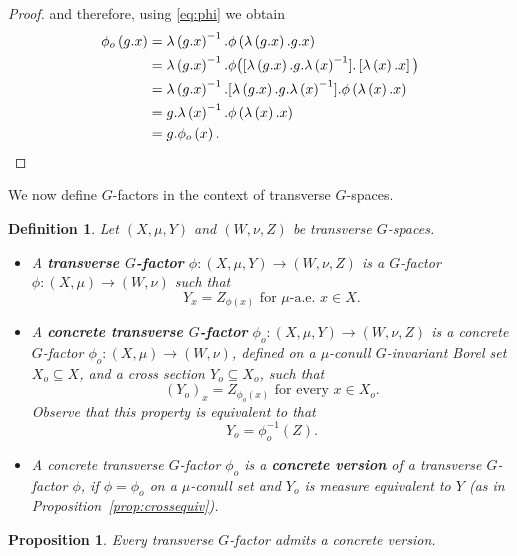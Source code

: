 \documentclass{amsart}
\numberwithin{equation}{subsection}
\newtheorem{prop}[thm]{Proposition}
\newtheorem{defn}[thm]{Definition}
\theoremstyle{remark}
\begin{document}
\begin{proof}
and therefore, using \eqref{eq:phi} we obtain
\begin{align*}
\phi_{o}\left(g.x\right)	
&=\lambda\left(g.x\right)^{-1}.\phi\left(\lambda\left(g.x\right).g.x\right)\\
&=\lambda\left(g.x\right)^{-1}.\phi\big(\small[\lambda\left(g.x\right).g.\lambda\left(x\right)^{-1}\small].\left[\lambda\left(x\right).x\right]\big)\\
&=\lambda\left(g.x\right)^{-1}.\small[\lambda\left(g.x\right).g.\lambda\left(x\right)^{-1}\small].\phi\left(\lambda\left(x\right).x\right)\\
&=g.\lambda\left(x\right)^{-1}.\phi\left(\lambda\left(x\right).x\right)\\
&=g.\phi_{o}\left(x\right).\qedhere
\end{align*}
\end{proof}

We now define \(G\)-factors in the context of transverse \(G\)-spaces.

\begin{defn}
Let \(\left(X,\mu,Y\right)\) and \(\left(W,\nu,Z\right)\) be transverse \(G\)-spaces.
\begin{itemize}
    \item A {\bf transverse \(G\)-factor} \(\phi:\left(X,\mu,Y\right)\to\left(W,\nu,Z\right)\) is a \(G\)-factor \(\phi:\left(X,\mu\right)\to\left(W,\nu\right)\) such that
    \[Y_{x}=Z_{\phi\left(x\right)}\text{ for }\mu\text{-a.e. }x\in X.\]
    \item A {\bf concrete transverse \(G\)-factor} \(\phi_{o}:\left(X,\mu,Y\right)\to\left(W,\nu,Z\right)\) is a concrete \(G\)-factor \(\phi_{o}:\left(X,\mu\right)\to\left(W,\nu\right)\), defined on a \(\mu\)-conull \(G\)-invariant Borel set \(X_{o}\subseteq X\), and a cross section \(Y_{o}\subseteq X_{o}\), such that
    \[\left(Y_{o}\right)_{x}=Z_{\phi_{o}\left(x\right)}\text{ for every }x\in X_{o}.\]
    Observe that this property is equivalent to that
    \[Y_{o}=\phi_{o}^{-1}\left(Z\right).\]
    \item A concrete transverse \(G\)-factor \(\phi_{o}\) is a {\bf concrete version} of a transverse \(G\)-factor \(\phi\), if \(\phi=\phi_{o}\) on a \(\mu\)-conull set and \(Y_{o}\) is measure equivalent to \(Y\) (as in Proposition~\ref{prop:crossequiv}).
\end{itemize}
\end{defn}

\begin{prop}\label{prop:conctrans}
Every transverse \(G\)-factor admits a concrete version.
\end{prop}
\end{document}
